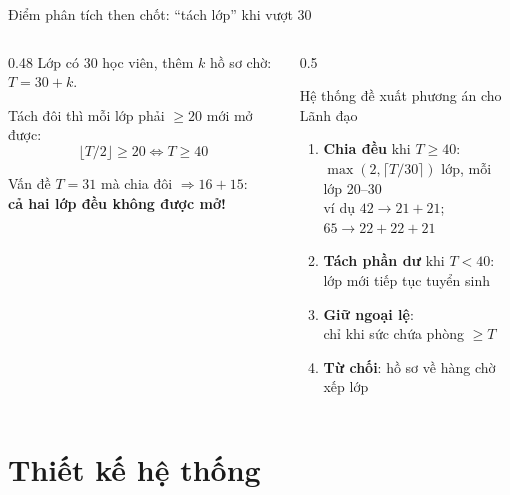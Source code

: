 \documentclass[aspectratio=169,11pt]{beamer}
\begin{document}
\begin{frame}{Điểm phân tích then chốt: “tách lớp” khi vượt 30}
  \begin{columns}[T]
    \begin{column}{0.48\linewidth}
      Lớp có 30 học viên, thêm $k$ hồ sơ chờ: $T = 30 + k$.

      Tách đôi thì mỗi lớp phải $\geq 20$ mới mở được:
      \[ \lfloor T/2 \rfloor \geq 20 \iff T \geq 40 \]
      \begin{alertblock}{Vấn đề}
        $T = 31$ mà chia đôi $\Rightarrow 16 + 15$:\\ \textbf{cả hai lớp đều không được mở!}
      \end{alertblock}
    \end{column}
    \begin{column}{0.5\linewidth}
      \begin{exampleblock}{Hệ thống đề xuất phương án cho Lãnh đạo}
        \begin{enumerate}
          \item \textbf{Chia đều} khi $T \geq 40$:\\ $\max(2, \lceil T/30 \rceil)$ lớp, mỗi lớp 20–30\\ {\small ví dụ $42 \to 21 + 21$; $65 \to 22 + 22 + 21$}
          \item \textbf{Tách phần dư} khi $T < 40$:\\ lớp mới tiếp tục tuyển sinh
          \item \textbf{Giữ ngoại lệ}:\\ chỉ khi sức chứa phòng $\geq T$
          \item \textbf{Từ chối}: hồ sơ về hàng chờ xếp lớp
        \end{enumerate}
      \end{exampleblock}
    \end{column}
  \end{columns}
\end{frame}

\section{Thiết kế hệ thống}
\end{document}
